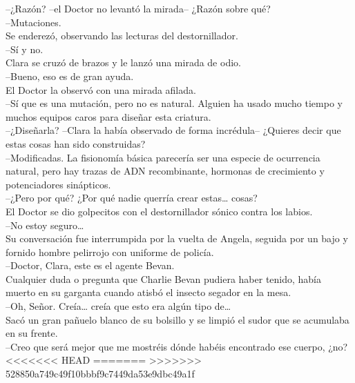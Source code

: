 {--¿Razón? --el Doctor no levantó la mirada-- ¿Razón sobre qué?\\
--Mutaciones.\\
Se enderezó, observando las lecturas del destornillador.\\
--Sí y no.\\
Clara se cruzó de brazos y le lanzó una mirada de odio.\\
--Bueno, eso es de gran ayuda.\\
El Doctor la observó con una mirada afilada.\\
--Sí que es una mutación, pero no es natural. Alguien ha usado mucho
tiempo y muchos equipos caros para diseñar esta criatura.\\
--¿Diseñarla? --Clara la había observado de forma incrédula-- ¿Quieres
decir que estas cosas han sido construidas?\\
--Modificadas. La fisionomía básica parecería ser una especie de
ocurrencia natural, pero hay trazas de ADN recombinante, hormonas de
crecimiento y potenciadores sinápticos.\\
--¿Pero por qué? ¿Por qué nadie querría crear estas\ldots{} cosas?\\
El Doctor se dio golpecitos con el destornillador sónico contra los
labios.\\
--No estoy seguro\ldots{}\\
Su conversación fue interrumpida por la vuelta de Angela, seguida por un
bajo y fornido hombre pelirrojo con uniforme de policía.\\
--Doctor, Clara, este es el agente Bevan.\\
Cualquier duda o pregunta que Charlie Bevan pudiera haber tenido, había
muerto en su garganta cuando atisbó el insecto segador en la mesa.\\
--Oh, Señor. Creía\ldots{} creía que esto era algún tipo de\ldots{}\\
Sacó un gran pañuelo blanco de su bolsillo y se limpió el sudor que se
acumulaba en su frente.\\
--Creo que será mejor que me mostréis dónde habéis encontrado ese
cuerpo, ¿no?\\
<<<<<<< HEAD
=======
}
>>>>>>> 528850a749c49f10bbbf9c7449da53e9dbc49a1f
